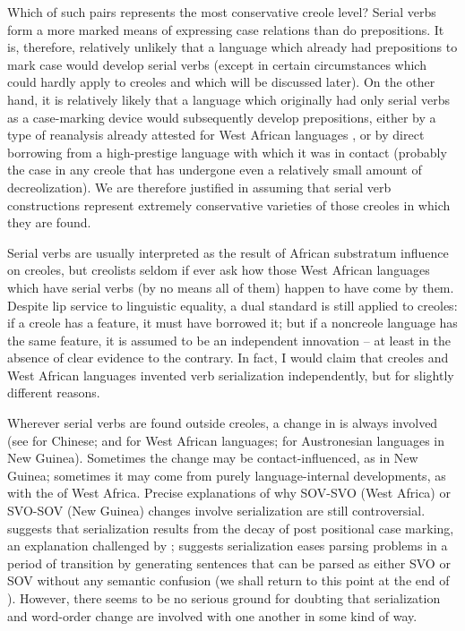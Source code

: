 Which of such pairs represents the most conservative creole level? Serial verbs form a more marked means of expressing case rela\-tions than do prepositions. It is, therefore, relatively unlikely that a language which already had prepositions to mark case would develop serial verbs (except in certain circumstances which could hardly apply to creoles and which will be discussed later). On the other hand, it is relatively likely that a language which originally had only serial verbs as a case-marking device would subsequently develop prepositions, either by a type of reanalysis already attested for West African languages \citep{Lord1976}, or by direct borrowing from a high-prestige language with which it was in contact (probably the case in any creole that has undergone even a relatively small amount of decreolization). We are therefore justified in assuming that serial verb constructions represent extremely conservative varieties of those creoles in which they are found.

Serial verbs are usually interpreted as the result of African substratum influence on creoles, but creolists seldom if ever ask how those West African languages which have serial verbs (by no means all of them) happen to have come by them. Despite lip service to linguistic equality, a dual standard is still applied to creoles: if a creole has a feature, it must have borrowed it; but if a noncreole language has the same feature, it is assumed to be an independent innovation -- at least in the absence of clear evidence to the contrary. In fact, I would claim that creoles and West African languages invented verb serialization independently, but for slightly different reasons.

Wherever serial verbs are found outside creoles, a change in  is always involved (see \citet{LiEtAl1974} for Chinese; \citet{Givón1974} and \citet{Hyman1974} for West African languages; \citet{Bradshaw1979} for Austronesian languages in New Guinea). Sometimes the change may be contact-influenced, as in New Guinea; sometimes it may come from purely language-internal developments, as with the  of West Africa. Precise explanations of why SOV-SVO (West Africa) or SVO-SOV (New Guinea) changes involve serialization are still controversial. \citet{Givón1974} suggests that serialization results from the decay of post positional case marking, an explanation chal\-lenged by \citet{Hyman1974}; \citet{Bradshaw1979} suggests serialization eases parsing problems in a period of transition by generating sentences that can be parsed as either SVO or SOV without any semantic confu\-sion (we shall return to this point at the end of ). However, there seems to be no serious ground for doubting that serialization and word-order change are involved with one another in some kind of way.

